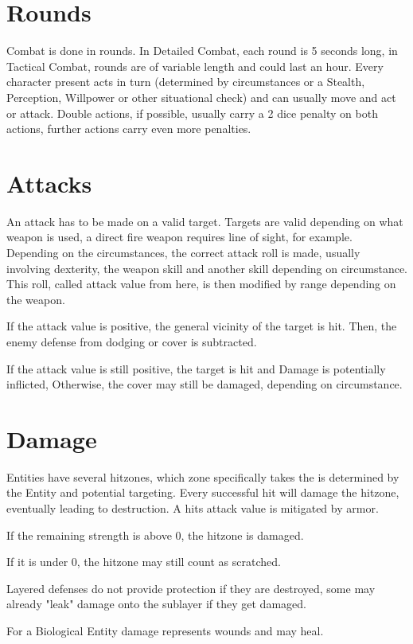 \section{Rounds}\label{sec:combat-rounds}
Combat is done in rounds.
In Detailed Combat, each round is 5 seconds long, in Tactical Combat, rounds are of variable length and could
last an hour.
Every character present acts in turn (determined by circumstances or a Stealth, Perception, Willpower or other
situational check) and can usually move and act or attack.
Double actions, if possible, usually carry a 2 dice penalty on both actions, further actions carry even more penalties.

\section{Attacks}\label{sec:combat-attacks}
An attack has to be made on a valid target.
Targets are valid depending on what weapon is used, a direct fire weapon requires line of sight, for example.
Depending on the circumstances, the correct attack roll is made, usually involving dexterity, the weapon skill and
another skill depending on circumstance.
This roll, called attack value from here, is then modified by range depending on the weapon.

If the attack value is positive, the general vicinity of the target is hit.
Then, the enemy defense from dodging or cover is subtracted.

If the attack value is still positive, the target is hit and Damage is potentially inflicted,
Otherwise, the cover may still be damaged, depending on circumstance.


\section{Damage}\label{sec:combat-damage}
Entities have several hitzones, which zone specifically takes the is determined by the Entity and potential targeting.
Every successful hit will damage the hitzone, eventually leading to destruction.
A hits attack value is mitigated by armor.

If the remaining strength is above 0, the hitzone is damaged.

If it is under 0, the hitzone may still count as scratched.

Layered defenses do not provide protection if they are destroyed, some may already "leak" damage onto the sublayer
if they get damaged.

For a Biological Entity damage represents wounds and may heal.


